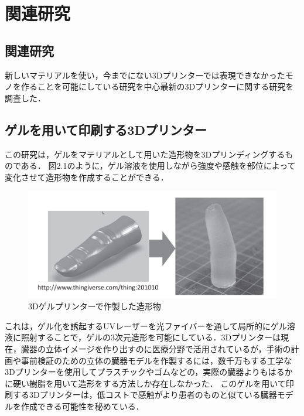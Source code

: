 \chapter{関連研究}
\label{chp:first}

\section{関連研究}
\label{sec:paragraph}
新しいマテリアルを使い，今までにない3Dプリンターでは表現できなかったモノを作ることを可能にしている研究を中心最新の3Dプリンターに関する研究を調査した．


\section{ゲルを用いて印刷する3Dプリンター\cite{a}}
\label{sec:enum}

この研究は，ゲルをマテリアルとして用いた造形物を3Dプリンディングするものである．
図2.1のように，ゲル溶液を使用しながら強度や感触を部位によって変化させて造形物を作成することができる．

\begin{figure}[H]
  \centering
  \includegraphics[width=14truecm]{./fig/geru3D.png}
  \caption{3Dゲルプリンターで作製した造形物}
  \label{fig:ss}
\end{figure}

これは，ゲル化を誘起するUVレーザーを光ファイバーを通して局所的にゲル溶液に照射することで，ゲルの3次元造形を可能にしている．3Dプリンターは現在，臓器の立体イメージを作り出すのに医療分野で活用されているが，手術の計画や事前検証のための立体の臓器モデルを作製するには，数千万もする工学な3Dプリンターを使用してプラスチックやゴムなどの，実際の臓器よりもはるかに硬い樹脂を用いて造形をする方法しか存在しなかった．
このゲルを用いて印刷する3Dプリンターは，低コストで感触がより患者のものと似ている臓器モデルを作成できる可能性を秘めている．

